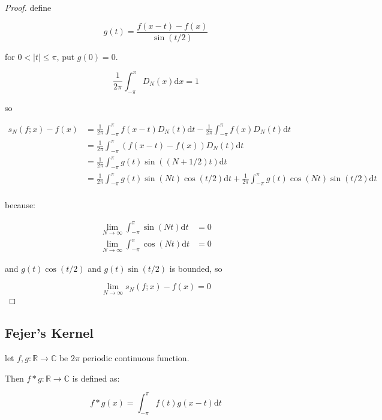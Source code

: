 \begin{proof}
    define

    \[
        g(t) = \frac{f(x-t) - f(x)}{\sin (t/2)}
    \]

    for $0 < |t| \le \pi$, put $g(0) = 0$.

    \[
        \frac{1}{2 \pi} \int_{- \pi}^{\pi} D_N(x) \mathrm{d} x = 1
    \]

    so

    \begin{align*}
        s_N(f;x) - f(x) &= \frac{1}{2 \pi} \int_{-\pi}^{\pi} f(x-t) D_N(t) \mathrm{d}t - \frac{1}{2 \pi} \int_{- \pi}^{\pi} f(x) D_N(t) \mathrm{d} t \\
        &=\frac{1}{2 \pi} \int_{- \pi}^{\pi} \left(f(x-t) - f(x)\right) D_N(t) \mathrm{d} t \\
        &=\frac{1}{2 \pi} \int_{- \pi}^{\pi} g(t) \sin \left((N + 1/2)t \right) \mathrm{d} t \\
        &=\frac{1}{2 \pi} \int_{- \pi}^{\pi} g(t) \sin \left(Nt \right) \cos (t/2) \mathrm{d} t + \frac{1}{2 \pi} \int_{- \pi}^{\pi} g(t) \cos \left(Nt \right) \sin (t/2) \mathrm{d} t \\
    \end{align*}

    because:

    \begin{align*}
        \lim_{N \to \infty} \int_{-\pi}^{\pi} \sin (Nt) \mathrm{d}t &= 0 \\
        \lim_{N \to \infty} \int_{-\pi}^{\pi} \cos (Nt) \mathrm{d}t &= 0
    \end{align*}

    and $g(t) \cos (t/2)$ and $g(t) \sin(t/2)$ is bounded, so

    \[
        \lim_{N \to \infty}s_N(f;x) - f(x) = 0
    \]
\end{proof}

\subsection{Fejer's Kernel}

\begin{definition}
    let $f,g: \mathbb{R} \to \mathbb{C}$ be $2\pi$ periodic continuous function. 

    Then $f \ast g: \mathbb{R} \to \mathbb{C}$ is defined as:

    \[
        f \ast g(x) = \int_{-\pi}^{\pi} f(t)g(x - t) \mathrm{d}t
    \]
\end{definition}

